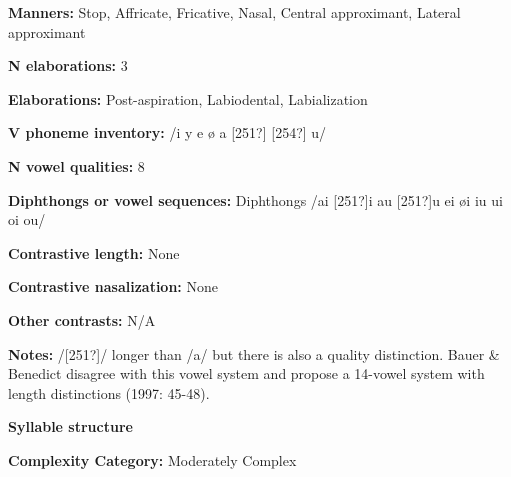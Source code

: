 \begin{styleBody}
\textbf{Manners: }Stop, Affricate, Fricative, Nasal, Central approximant, Lateral approximant
\end{styleBody}

\begin{styleBody}
\textbf{N elaborations:} 3
\end{styleBody}

\begin{styleBody}
\textbf{Elaborations: }Post-aspiration, Labiodental, Labialization
\end{styleBody}

\begin{styleBody}
\textbf{V phoneme inventory:} /i y e ø a [251?] [254?] u/
\end{styleBody}

\begin{styleBody}
\textbf{N vowel qualities:} 8
\end{styleBody}

\begin{styleBody}
\textbf{Diphthongs or vowel sequences:} Diphthongs /ai [251?]i au [251?]u ei øi iu ui oi ou/
\end{styleBody}

\begin{styleBody}
\textbf{Contrastive length:} None
\end{styleBody}

\begin{styleBody}
\textbf{Contrastive nasalization:} None
\end{styleBody}

\begin{styleBody}
\textbf{Other contrasts:} N/A
\end{styleBody}

\begin{styleBody}
\textbf{Notes:} /[251?]/ longer than /a/ but there is also a quality distinction. Bauer \& Benedict disagree with this vowel system and propose a 14-vowel system with length distinctions (1997: 45-48).
\end{styleBody}

\begin{styleBody}
\textbf{Syllable structure}
\end{styleBody}

\begin{styleBody}
\textbf{Complexity Category:} Moderately Complex
\end{styleBody}

